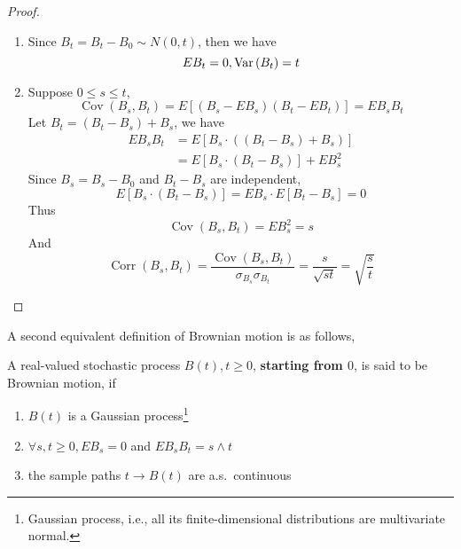 \begin{proof}
	\begin{enumerate}
		\item Since $B_{t}=B_{t}-B_{0}\sim N(0, t)$, then we have
		      \begin{equation*}
			      EB_{t}=0,\mathrm{Var}\left(B_{t}\right)=t
		      \end{equation*}
		\item Suppose $0\leq s\leq t$,
		      \begin{equation*}
			      \operatorname{Cov}\left(B_{s}, B_{t}\right)=E\left[\left(B_{s}-EB_{s}\right)\left(B_{t}-EB_{t}\right)\right]=EB_{s}B_{t}
		      \end{equation*}
		      Let $B_{t}=\left(B_{t}-B_{s}\right)+B_{s}$, we have
		      \begin{equation*}
			      \begin{aligned}
				      EB_{s}B_{t} & =E\left[B_{s}\cdot\left(\left(B_{t}-B_{s}\right)+B_{s}\right)\right] \\
				                  & =E\left[B_{s}\cdot\left(B_{t}-B_{s}\right)\right]+EB_{s}^{2}
			      \end{aligned}
		      \end{equation*}
		      Since $B_{s}=B_{s}-B_{0}$ and $B_{t}-B_{s}$ are independent,
		      \begin{equation*}
			      E\left[B_{s} \cdot\left(B_{t}-B_{s}\right)\right]=EB_{s} \cdot E\left[B_{t}-B_{s}\right]=0
		      \end{equation*}
		      Thus
		      \begin{equation*}
			      \operatorname{Cov}\left(B_{s}, B_{t}\right)=EB_{s}^{2}=s
		      \end{equation*}
		      And
		      \begin{equation*}
			      \operatorname{Corr}\left(B_{s},B_{t}\right)=\frac{\operatorname{Cov}\left(B_{s},B_{t}\right)}{\sigma_{B_{s}}\sigma_{B_{t}}}=\frac{s}{\sqrt{st}}=\sqrt{\frac{s}{t}}
		      \end{equation*}
	\end{enumerate}
\end{proof}

A second equivalent definition of Brownian motion is as follows,

\begin{definition}
	A real-valued stochastic process $B(t),t\geq 0$, \textbf{starting from $0$}, is said to be Brownian motion, if
	\begin{enumerate}
		\item $B(t)$ is a Gaussian process\footnote{Gaussian process, i.e., all its finite-dimensional distributions are multivariate normal.}
		\item $\forall s,t\geq 0,EB_{s}=0$ and $EB_{s}B_{t}=s\wedge t$
		\item the sample paths $t\rightarrow B(t)$ are a.s.\ continuous
	\end{enumerate}
\end{definition}

